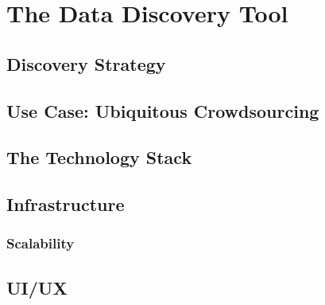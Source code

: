 \chapter{The Data Discovery Tool}\label{ch:ch2label}

\section{Discovery Strategy}


\section{Use Case: Ubiquitous Crowdsourcing}

\section{The Technology Stack}

\section{Infrastructure}

\subsection{Scalability}

\section{UI/UX}